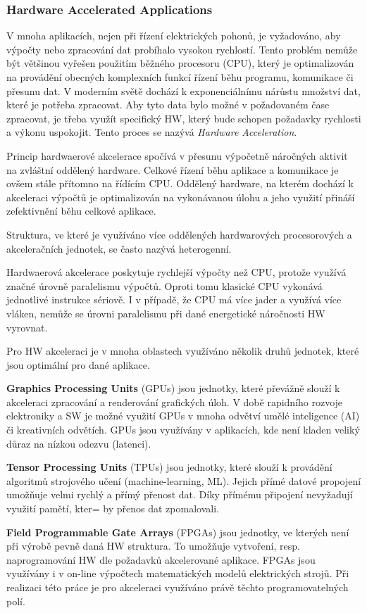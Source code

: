 \documentclass[a4paper, twoside, 11pt]{article}
\begin{document}
		\subsubsection{Hardware Accelerated Applications}\label{subsec:hardware-accelerated-applications}
		V mnoha aplikacích, nejen při řízení elektrických pohonů, je vyžadováno, aby výpočty nebo zpracování dat probíhalo vysokou rychlostí. Tento problém nemůže být většinou vyřešen použitím běžného procesoru (CPU), který je optimalizován na provádění obecných komplexních funkcí řízení běhu programu, komunikace či přesunu dat. V moderním světě dochází k exponenciálnímu nárůstu množství dat, které je potřeba zpracovat. Aby tyto data bylo možné v požadovaném čase zpracovat, je třeba využít specifický HW, který bude schopen požadavky rychlosti a výkonu uspokojit. Tento proces se nazývá \textit{Hardware Acceleration}. \cite{xilinx-accelerated-computing}\par
		Princip hardwaerové akcelerace spočívá v přesunu výpočetně náročných aktivit na zvláštní oddělený hardware. Celkové řízení běhu aplikace a komunikace je ovšem stále přítomno na řídícím CPU. Oddělený hardware, na kterém dochází k akceleraci výpočtů je optimalizován na vykonávanou úlohu a jeho využití přináší zefektivnění běhu celkové aplikace. \cite{xilinx-accelerated-computing}\par
		Struktura, ve které je využíváno více oddělených hardwarových procesorových a akceleračních jednotek, se často nazývá heterogenní. \cite{xilinx-accelerated-computing}\par
		Hardwaerová akcelerace poskytuje rychlejší výpočty než CPU, protože využívá značné úrovně paralelismu výpočtů. Oproti tomu klasické CPU vykonává jednotlivé instrukce sériově. I v případě, že CPU má více jader a využívá více vláken, nemůže se úrovni paralelismu při dané energetické náročnosti HW vyrovnat.\par
		Pro HW akceleraci je v mnoha oblastech využíváno několik druhů jednotek, které jsou optimální pro dané aplikace.\par
		\textbf{Graphics Processing Units} (GPUs) jsou jednotky, které převážně slouží k akceleraci zpracování a renderování grafických úloh. V době rapidního rozvoje elektroniky a SW je možné využití GPUs v mnoha odvětví umělé inteligence (AI) či kreativních odvětích. GPUs jsou využívány v aplikacích, kde není kladen veliký důraz na nízkou odezvu (latenci). \cite{xilinx-accelerated-computing}\par
		\textbf{Tensor Processing Units} (TPUs) jsou jednotky, které slouží k provádění algoritmů strojového učení (machine-learning, ML). Jejich přímé datové propojení umožňuje velmi rychlý a přímý přenost dat. Díky přímému připojení nevyžadují využití pamětí, kter= by přenos dat zpomalovali. \cite{xilinx-accelerated-computing}\par
		\textbf{Field Programmable Gate Arrays} (FPGAs) jsou jednotky, ve kterých není při výrobě pevně daná HW struktura. To umožňuje vytvoření, resp. naprogramování HW dle požadavků akcelerované aplikace. FPGAs jsou využívány i v on-line výpočtech matematických modelů elektrických strojů. Při realizaci této práce je pro akceleraci využíváno právě těchto programovatelných polí.
\end{document}
